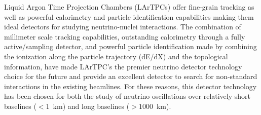 Liquid Argon Time Projection Chambers (LArTPCs) offer fine-grain tracking as well as powerful calorimetry and particle identification capabilities making them ideal detectors for studying neutrino-nuclei interactions. The combination of millimeter scale tracking capabilities, outstanding calorimetry through a fully active/sampling detector, and powerful particle identification made by combining the ionization along the particle trajectory (dE/dX) and the topological information, have made LArTPC's the premier neutrino detector technology choice for the future and provide an excellent detector to search for non-standard interactions in the existing beamlines. For these reasons, this detector technology has been chosen for both the study of neutrino oscillations over relatively short baselines ($<1$~km) and long baselines ($>1000$~km). 





